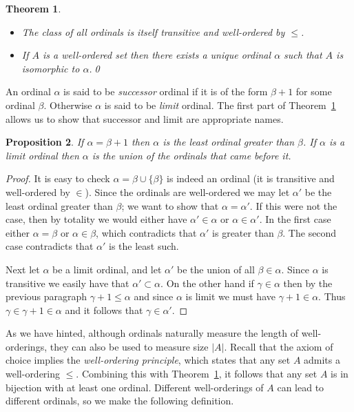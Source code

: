 \documentclass[11pt,oneside]{amsbook}
\theoremstyle{definition}
\theoremstyle{plain}
\newtheorem{thm}{Theorem}[section]
\newtheorem{prop}[thm]{Proposition}
\theoremstyle{definition}
\theoremstyle{remark}
\begin{document}
\begin{thm}\
  \label{thm:ordinals}
  \begin{itemize}
  \item The class of all ordinals is itself transitive and well-ordered by $\leq$.
  \item If $A$ is a well-ordered set then there exists a unique ordinal $\alpha$ such that $A$ is isomorphic to $\alpha$.\qed
  \end{itemize}
\end{thm}

An ordinal $\alpha$ is said to be \emph{successor} ordinal if it is of the form $\beta+1$ for some ordinal $\beta$. Otherwise $\alpha$ is said to be \emph{limit} ordinal. The first part of Theorem~\ref{thm:ordinals} allows us to show that successor and limit are appropriate names.

\begin{prop}
  If $\alpha=\beta+1$ then $\alpha$ is the least ordinal greater than $\beta$. If $\alpha$ is a limit ordinal then $\alpha$ is the union of the ordinals that came before it.
\end{prop}

\begin{proof}
  It is easy to check $\alpha=\beta\cup\{\beta\}$ is indeed an ordinal (it is transitive and well-ordered by $\in$). Since the ordinals are well-ordered we may let $\alpha'$ be the least ordinal greater than $\beta$; we want to show that $\alpha=\alpha'$. If this were not the case, then by totality we would either have $\alpha'\in\alpha$ or $\alpha\in\alpha'$. In the first case either $\alpha=\beta$ or $\alpha\in\beta$, which contradicts that $\alpha'$ is greater than $\beta$. The second case contradicts that $\alpha'$ is the least such.

  Next let $\alpha$ be a limit ordinal, and let $\alpha'$ be the union of all $\beta\in\alpha$. Since $\alpha$ is transitive we easily have that $\alpha'\subset\alpha$. On the other hand if $\gamma\in\alpha$ then by the previous paragraph $\gamma+1\leq\alpha$ and since $\alpha$ is limit we must have $\gamma+1\in\alpha$. Thus $\gamma\in\gamma+1\in\alpha$ and it follows that $\gamma\in\alpha'$.
\end{proof}

As we have hinted, although ordinals naturally measure the length of well-orderings, they can also be used to measure size $|A|$. Recall that the axiom of choice implies the \emph{well-ordering principle}, which states that any set $A$ admits a well-ordering $\leq$. Combining this with Theorem~\ref{thm:ordinals}, it follows that any set $A$ is in bijection with at least one ordinal. Different well-orderings of $A$ can lead to different ordinals, so we make the following definition.
\end{document}
